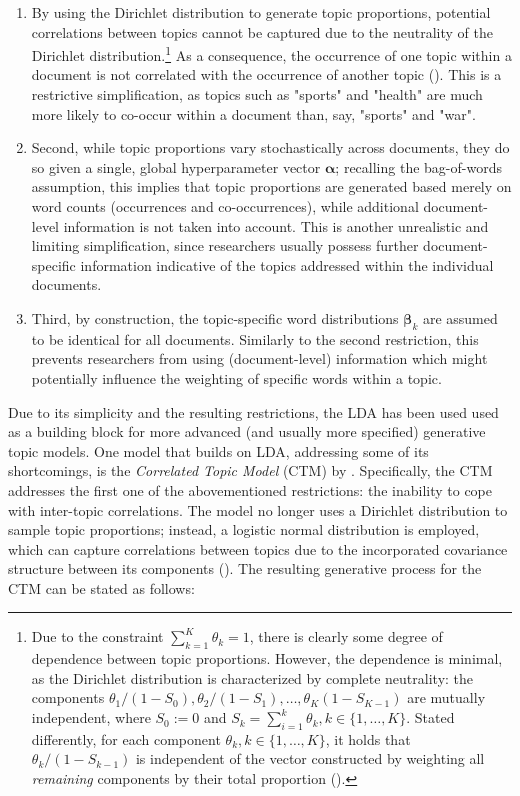 \begin{enumerate}[label=(\roman*)]
\item By using the Dirichlet distribution to generate topic proportions, potential correlations between topics cannot be captured due to the neutrality of the Dirichlet distribution.\footnote{Due to the constraint $\sum_{k=1}^{K}\theta_{k}=1$, there is clearly some degree of dependence between topic proportions. However, the dependence is minimal, as the Dirichlet distribution is characterized by complete neutrality: the components $\theta_1/(1-S_0), \theta_2/(1-S_1),\dots, \theta_K(1-S_{K-1})$ are mutually independent, where $S_0:=0$ and $S_k = \sum_{i=1}^{k}\theta_k, k \in \{1,\dots,K\}$. Stated differently, for each component $\theta_k, k \in \{1,\dots,K\}$, it holds that $\theta_k/(1-S_{k-1})$ is independent of the vector constructed by weighting all \textit{remaining} components by their total proportion (\citealp{james1980new}).} As a consequence, the occurrence of one topic within a document is not correlated with the occurrence of another topic (\citealp{blei2007correlated}). This is a restrictive simplification, as topics such as "sports" and "health" are much more likely to co-occur within a document than, say, "sports" and "war".
\item Second, while topic proportions vary stochastically across documents, they do so given a single, global hyperparameter vector $\boldsymbol{\alpha}$; recalling the bag-of-words assumption, this implies that topic proportions are generated based merely on word counts (occurrences and co-occurrences), while additional document-level information is not taken into account. This is another unrealistic and limiting simplification, since researchers usually possess further document-specific information indicative of the topics addressed within the individual documents.
\item Third, by construction, the topic-specific word distributions $\boldsymbol{\beta}_k$ are assumed to be identical for all documents. Similarly to the second restriction, this prevents researchers from using (document-level) information which might potentially influence the weighting of specific words within a topic.
\end{enumerate}

\noindent
Due to its simplicity and the resulting restrictions, the LDA has been used used as a building block for more advanced (and usually more specified) generative topic models. One model that builds on LDA, addressing some of its shortcomings, is the \textit{Correlated Topic Model} (CTM) by \cite{blei2007correlated}. Specifically, the CTM addresses the first one of the abovementioned restrictions: the inability to cope with inter-topic correlations. The model no longer uses a Dirichlet distribution to sample topic proportions; instead, a logistic normal distribution is employed, which can capture correlations between topics due to the incorporated covariance structure between its components (\citealp{atchison1980logistic}). The resulting generative process for the CTM can be stated as follows:

